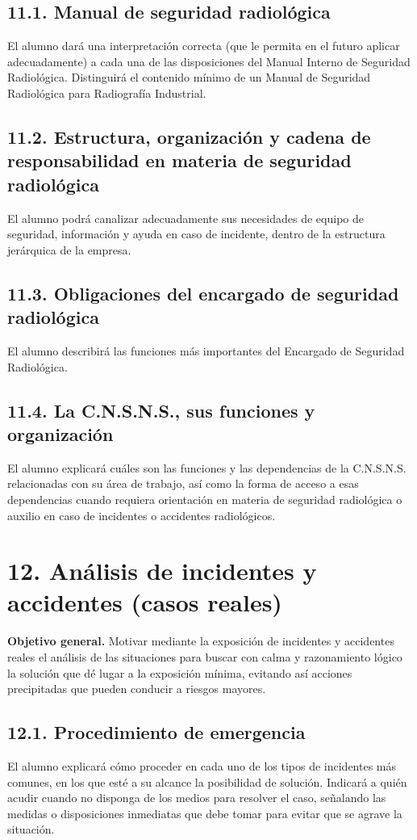 \subsection*{11.1. Manual de seguridad radiológica}
El alumno dará una interpretación correcta (que le permita en el futuro aplicar adecuadamente) a cada una de las disposiciones del Manual Interno de Seguridad Radiológica. Distinguirá el contenido mínimo de un Manual de Seguridad Radiológica para Radiografía Industrial.

\subsection*{11.2. Estructura, organización y cadena de responsabilidad en materia de seguridad radiológica}
El alumno podrá canalizar adecuadamente sus necesidades de equipo de seguridad, información y ayuda en caso de incidente, dentro de la estructura jerárquica de la empresa.

\subsection*{11.3. Obligaciones del encargado de seguridad radiológica}
El alumno describirá las funciones más importantes del Encargado de Seguridad Radiológica.

\subsection*{11.4. La C.N.S.N.S., sus funciones y organización}
El alumno explicará cuáles son las funciones y las dependencias de la C.N.S.N.S. relacionadas con su área de trabajo, así como la forma de acceso a esas dependencias cuando requiera orientación en materia de seguridad radiológica o auxilio en caso de incidentes o accidentes radiológicos.

\section*{12. Análisis de incidentes y accidentes (casos reales) }
\textbf{Objetivo general.} Motivar mediante la exposición de incidentes y accidentes reales el análisis de las situaciones para buscar con calma y razonamiento lógico la solución que dé lugar a la exposición mínima, evitando así acciones precipitadas que pueden conducir a riesgos mayores.

\subsection*{12.1. Procedimiento de emergencia}
El alumno explicará cómo proceder en cada uno de los tipos de incidentes más comunes, en los que esté a su alcance la posibilidad de solución. Indicará a quién acudir cuando no disponga de los medios para resolver el caso, señalando las medidas o disposiciones inmediatas que debe tomar para evitar que se agrave la situación.

